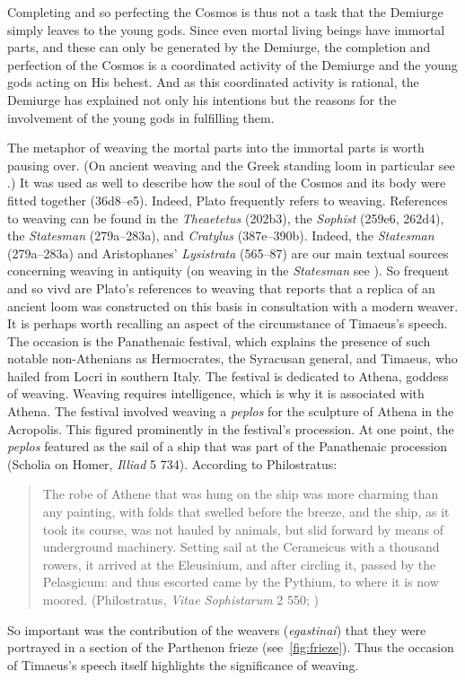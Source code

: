 Completing and so perfecting the Cosmos is thus not a task that the Demiurge simply leaves to the young gods. Since even mortal living beings have immortal parts, and these can only be generated by the Demiurge, the completion and perfection of the Cosmos is a coordinated activity of the Demiurge and the young gods acting on His behest. And as this coordinated activity is rational, the Demiurge has explained not only his intentions but the reasons for the involvement of the young gods in fulfilling them.

The metaphor of weaving the mortal parts into the immortal parts is worth pausing over. (On ancient weaving and the Greek standing loom in particular see \citealt{Burke:2010aa,Crowfoot:1936aa,Flores:2006aa,Hoffmann:1964aa}.) It was used as well to describe how the soul of the Cosmos and its body were fitted together (36d8–e5). Indeed, Plato frequently refers to weaving. References to weaving can be found in the \emph{Theaetetus} (202b3), the \emph{Sophist} (259e6, 262d4), the \emph{Statesman} (279a--283a), and \emph{Cratylus} (387e--390b). Indeed, the \emph{Statesman} (279a--283a) and Aristophanes' \emph{Lysistrata} (565--87) are our main textual sources concerning weaving in antiquity (on weaving in the \emph{Statesman} see \citealt{Cole:1991qq}). So frequent and so vivd are Plato's references to weaving that \citet[44, n1]{Skemp:1952aa} reports that a replica of an ancient loom was constructed on this basis in consultation with a modern weaver. It is perhaps worth recalling an aspect of the circumstance of Timaeus's speech. The occasion is the Panathenaic festival, which explains the presence of such notable non-Athenians as Hermocrates, the Syracusan general, and Timaeus, who hailed from Locri in southern Italy. The festival is dedicated to Athena, goddess of weaving. Weaving requires intelligence, which is why it is associated with Athena. The festival involved weaving a \emph{peplos} for the sculpture of Athena in the Acropolis. This figured prominently in the festival's procession. At one point, the \emph{peplos} featured as the sail of a ship that was part of the Panathenaic procession (Scholia on Homer, \emph{Illiad} 5 734). According to Philostratus: 
\begin{quote}
	The robe of Athene that was hung on the ship was more charming than any painting, with folds that swelled before the breeze, and the ship, as it took its course, was not hauled by animals, but slid forward by means of underground machinery. Setting sail at the Cerameicus with a thousand rowers, it arrived at the Eleusinium, and after circling it, passed by the Pelasgicum: and thus escorted came by the Pythium, to where it is now moored. (Philostratus, \emph{Vitae Sophistarum} 2 550; \citealt[147]{Wright:1922aa})
\end{quote}
So important was the contribution of the weavers (\emph{egastinai}) that they were portrayed in a section of the Parthenon frieze (see~\ref{fig:frieze}). Thus the occasion of Timaeus's speech itself highlights the significance of weaving. 

